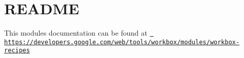 \chapter{README}
\hypertarget{md_pkiclassroomrescheduler_2src_2main_2frontend_2node__modules_2workbox-recipes_2_r_e_a_d_m_e}{}\label{md_pkiclassroomrescheduler_2src_2main_2frontend_2node__modules_2workbox-recipes_2_r_e_a_d_m_e}
This module\textquotesingle{}s documentation can be found at \href{https://developers.google.com/web/tools/workbox/modules/workbox-recipes}{\texttt{ https\+://developers.\+google.\+com/web/tools/workbox/modules/workbox-\/recipes}} 